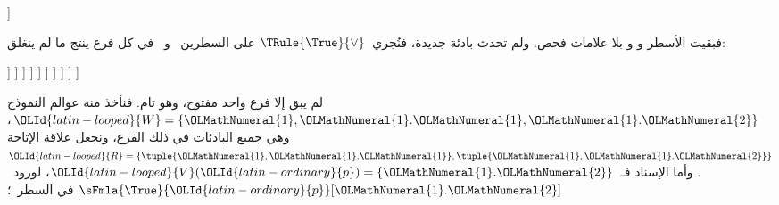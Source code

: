 \documentclass[../../../include/open-logic-section]{subfiles}
\begin{document}
{\begin{ex}
\begin{oltableau}
    ]
  \end{oltableau}
  فبقيت الأسطر  و و بلا علامات فحص. ولم تحدث بادئة جديدة،
  فنُجري~$\TRule{\True}{\lor}$ على السطرين~ و~ في كل فرع
  ينتج ما لم ينغلق:
  \begin{oltableau}
    [\pFmla{\False}{\Box(p \lor q) \lif (\Box p \lor \Box q)}{1},
      just = \TAss, checked
      [\pFmla{\True}{\Box(p \lor q)}{1},
        just = {\TRule{\False}{\lif}[1]}, checked
        [\pFmla{\False}{\Box p \lor \Box q}{1},
          just = {\TRule{\False}{\lif}[1]}, checked
          [\pFmla{\False}{\Box p}{1},
            just = {\TRule{\False}{\lor}[3]}, checked
            [\pFmla{\False}{\Box q}{1},
              just = {\TRule{\False}{\lor}[3]}, checked
              [\pFmla{\False}{p}{1.1}, 
                just = {\TRule{\False}{\Box}[4]}, checked
                [\pFmla{\False}{q}{1.2}, 
                  just = {\TRule{\False}{\Box}[5]}, checked
                  [\pFmla{\True}{p \lor q}{1.1}, 
                    just = {\TRule{\True}{\Box}[2]}, checked
                    [\pFmla{\True}{p \lor q}{1.2}, 
                      just = {\TRule{\True}{\Box}[2]}, checked
                      [\pFmla{\True}{p}{1.1},
                        just = {\TRule{\True}{\lor}[8]}, checked, close
                      ]
                      [\pFmla{\True}{q}{1.1},
                        just = {\TRule{\True}{\lor}[8]}, checked
                        [\pFmla{\True}{p}{1.2},
                          just = {\TRule{\True}{\lor}[9]}, checked]
                        [\pFmla{\True}{q}{1.2},
                          just = {\TRule{\True}{\lor}[9]}, checked, close]
                      ]
                    ]
                  ]
                ]
              ]
            ]
          ]
        ]
      ]
    ]
  \end{oltableau}
  لم يبق إلا فرع واحد مفتوح، وهو تام. فنأخذ منه عوالم النموذج
  ${\OLId{latin-looped}{W}} = \{{\OLMathNumeral{1}}, {\OLMathNumeral{1}}.{\OLMathNumeral{1}}, {\OLMathNumeral{1}}.{\OLMathNumeral{2}}\}$، وهي جميع البادئات في ذلك الفرع،
  ونجعل علاقة الإتاحة
  ${\OLId{latin-looped}{R}} = \{\tuple{{\OLMathNumeral{1}}, {\OLMathNumeral{1}}.{\OLMathNumeral{1}}}, \tuple{{\OLMathNumeral{1}}, {\OLMathNumeral{1}}.{\OLMathNumeral{2}}}\}$.
  وأما الإسناد فـ~${\OLId{latin-looped}{V}}({\OLId{latin-ordinary}{p}}) =
  \{{\OLMathNumeral{1}}.{\OLMathNumeral{2}}\}$، لورود~$\sFmla{\True}{{\OLId{latin-ordinary}{p}}}[{\OLMathNumeral{1}}.{\OLMathNumeral{2}}]$ في السطر~؛

\end{ex}}
\end{document}
